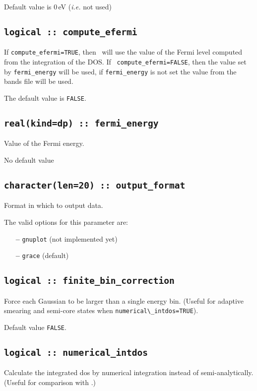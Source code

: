 \documentclass[a4paper,11pt,twoside]{book}
\begin{document}
Default value is 0\,eV (\emph{i.e.} not used)

\subsection[compute\_efermi]{{\tt logical :: compute\_efermi}}

If {\tt compute\_efermi=TRUE}, then \optados\ will use the value of the Fermi
level computed from the integration of the DOS. If {\tt
  compute\_efermi=FALSE}, then the value set by {\tt fermi\_energy} will be
used, if {\tt fermi\_energy} is not set the value from the bands file will be used.

The default value is {\tt FALSE}.

\subsection[fermi\_energy]{\tt real(kind=dp) :: fermi\_energy}
Value of the Fermi energy.

No default value

\subsection[output\_format]{\tt character(len=20) :: output\_format}
Format in which to output data.

The valid options for this parameter are:
\begin{itemize}
\item[{\bf --}]  \verb#gnuplot# (not implemented yet)
\item[{\bf --}]  \verb#grace# (default)
\end{itemize}

\subsection[finite\_bin\_correction]{\tt logical :: finite\_bin\_correction}
Force each Gaussian to be larger than a single energy bin. (Useful for adaptive smearing and semi-core states when \verb#numerical\_intdos=TRUE#). 

Default value \verb#FALSE#.

\subsection[numerical\_intdos]{\tt logical :: numerical\_intdos}
Calculate the integrated dos by numerical integration instead of semi-analytically. (Useful for comparison with \lindos.)
\end{document}
